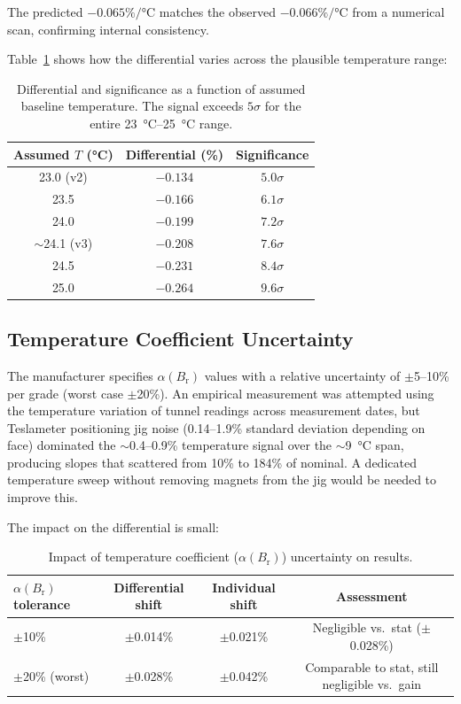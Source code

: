 \documentclass[11pt,letterpaper]{article}
\newcommand{\Br}{B_\mathrm{r}}
\newcommand{\alphar}{\alpha(\Br)}
\begin{document}
The predicted $-0.065\%/\si{\celsius}$ matches the observed
$-0.066\%/\si{\celsius}$ from a numerical scan, confirming internal
consistency.

Table~\ref{tab:temp_scan} shows how the differential varies across the
plausible temperature range:

\begin{table}[H]
\centering
\caption{Differential and significance as a function of assumed baseline
temperature. The signal exceeds $5\sigma$ for the entire \SIrange{23}{25}{\celsius}
range.}
\label{tab:temp_scan}
\begin{tabular}{@{}ccc@{}}
\toprule
\textbf{Assumed $T$ (\si{\celsius})} & \textbf{Differential (\%)} & \textbf{Significance} \\
\midrule
23.0 (v2) & $-0.134$ & $5.0\sigma$ \\
23.5      & $-0.166$ & $6.1\sigma$ \\
24.0      & $-0.199$ & $7.2\sigma$ \\
$\sim$24.1 (v3) & $-0.208$ & $7.6\sigma$ \\
24.5      & $-0.231$ & $8.4\sigma$ \\
25.0      & $-0.264$ & $9.6\sigma$ \\
\bottomrule
\end{tabular}
\end{table}

\subsection{Temperature Coefficient Uncertainty}

The manufacturer specifies $\alphar$ values with a relative uncertainty of
$\pm$5--10\% per grade (worst case $\pm$20\%). An empirical measurement was
attempted using the temperature variation of tunnel readings across
measurement dates, but Teslameter positioning jig noise
(0.14--1.9\% standard deviation depending on face) dominated the
$\sim$0.4--0.9\% temperature signal over the $\sim$\SI{9}{\celsius} span,
producing slopes that scattered from 10\% to 184\% of nominal. A dedicated
temperature sweep without removing magnets from the jig would be needed to
improve this.

The impact on the differential is small:

\begin{table}[H]
\centering
\caption{Impact of temperature coefficient ($\alphar$) uncertainty on results.}
\label{tab:alpha_uncertainty}
\begin{tabular}{@{}lccc@{}}
\toprule
$\alphar$ tolerance & Differential shift & Individual shift & Assessment \\
\midrule
$\pm$10\% & $\pm$0.014\% & $\pm$0.021\% & Negligible vs.\ stat ($\pm$0.028\%) \\
$\pm$20\% (worst) & $\pm$0.028\% & $\pm$0.042\% & Comparable to stat, still negligible vs.\ gain \\
\bottomrule
\end{tabular}
\end{table}
\end{document}
